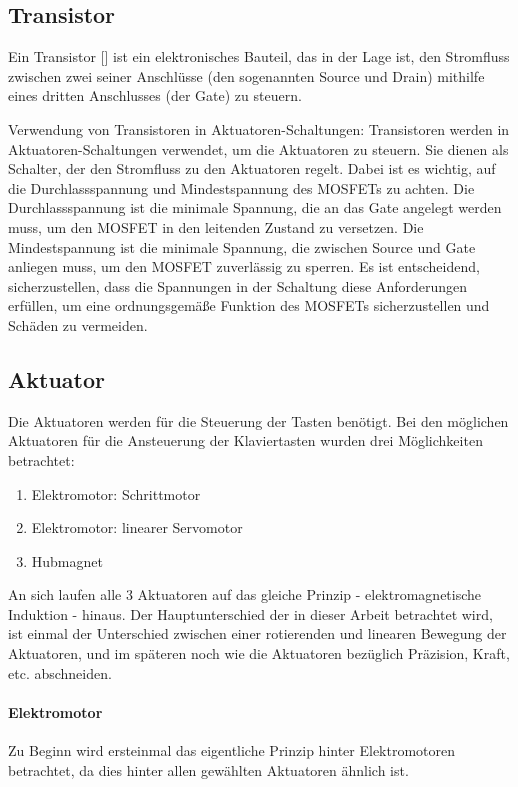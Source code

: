 \subsection{Transistor} 
Ein Transistor [\cite*[siehe ]{BipolarerTransistor}] ist ein elektronisches Bauteil, das in der Lage ist, den Stromfluss zwischen zwei seiner Anschlüsse
(den sogenannten Source und Drain) mithilfe eines dritten Anschlusses (der Gate) zu steuern.

Verwendung von Transistoren in Aktuatoren-Schaltungen:
Transistoren werden in Aktuatoren-Schaltungen verwendet, um die Aktuatoren
zu steuern. Sie dienen als Schalter, der den Stromfluss zu den Aktuatoren regelt.
Dabei ist es wichtig, auf die Durchlassspannung und Mindestspannung des MOSFETs zu achten. Die Durchlassspannung ist die
minimale Spannung, die an das Gate angelegt werden muss, um den MOSFET in den leitenden Zustand zu versetzen. Die
Mindestspannung ist die minimale Spannung, die zwischen Source und Gate anliegen muss, um den MOSFET zuverlässig zu
sperren.
Es ist entscheidend, sicherzustellen, dass die Spannungen in der Schaltung diese Anforderungen erfüllen, um
eine ordnungsgemäße Funktion des MOSFETs sicherzustellen und Schäden zu vermeiden.

\subsection{Aktuator}\label{subsec:aktuator}
Die Aktuatoren werden für die Steuerung der Tasten benötigt.
Bei den möglichen Aktuatoren für die Ansteuerung der Klaviertasten wurden drei Möglichkeiten betrachtet: %
\begin{enumerate}
	\item Elektromotor: Schrittmotor
	\item Elektromotor: linearer Servomotor
	\item Hubmagnet
\end{enumerate}
An sich laufen alle 3 Aktuatoren auf das gleiche Prinzip - elektromagnetische Induktion - hinaus. Der Hauptunterschied
der in dieser Arbeit betrachtet wird, ist einmal der Unterschied zwischen einer rotierenden und linearen Bewegung der Aktuatoren,
und im späteren noch wie die Aktuatoren bezüglich Präzision, Kraft, etc. abschneiden.
\paragraph{Elektromotor} \cite*[siehe ][]{Aufbau.Elektromotoren}
Zu Beginn wird ersteinmal das eigentliche Prinzip hinter Elektromotoren betrachtet, da dies hinter allen gewählten Aktuatoren
ähnlich ist.

